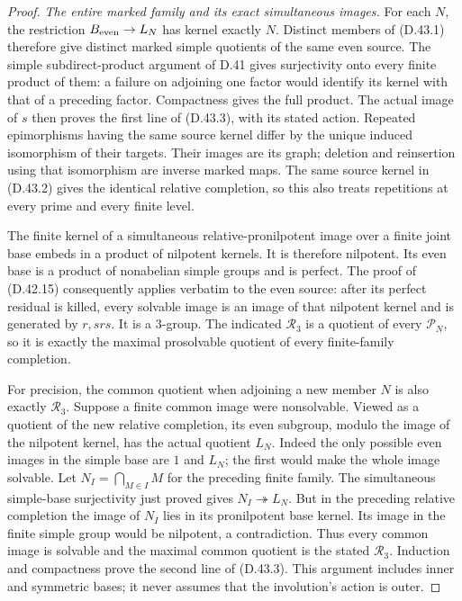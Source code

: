 \begin{proof}
\emph{The entire marked family and its exact simultaneous images.}
For each $N$, the restriction
$B_{\rm even}\to L_N$ has kernel exactly
$N$. Distinct members of (D.43.1)
therefore give distinct marked simple
quotients of the same even source.
The simple subdirect-product argument
of D.41 gives surjectivity onto every
finite product of them: a failure on
adjoining one factor would identify
its kernel with that of a preceding
factor. Compactness gives the full
product. The actual image of $s$
then proves the first line of
(D.43.3), with its stated action.
Repeated epimorphisms having the same
source kernel differ by the unique
induced isomorphism of their targets.
Their images are its graph; deletion
and reinsertion using that isomorphism
are inverse marked maps. The same
source kernel in (D.43.2) gives the
identical relative completion, so
this also treats repetitions at
every prime and every finite level.

The finite kernel of a simultaneous
relative-pronilpotent image over
a finite joint base embeds in a
product of nilpotent kernels.
It is therefore nilpotent. Its
even base is a product of
nonabelian simple groups and
is perfect. The proof of
(D.42.15) consequently applies
verbatim to the even source:
after its perfect residual is
killed, every solvable image
is an image of that nilpotent
kernel and is generated by
$r,srs$. It is a $3$-group.
The indicated $\mathcal R_3$
is a quotient of every
$\mathcal P_N$, so it is
exactly the maximal
prosolvable quotient of
every finite-family completion.

For precision, the common quotient
when adjoining a new member $N$
is also exactly $\mathcal R_3$.
Suppose a finite common image
were nonsolvable. Viewed as a
quotient of the new relative
completion, its even subgroup,
modulo the image of the
nilpotent kernel, has the
actual quotient $L_N$.
Indeed the only possible
even images in the simple
base are $1$ and $L_N$;
the first would make the
whole image solvable.
Let $N_I=\bigcap_{M\in I}M$
for the preceding finite
family. The simultaneous
simple-base surjectivity
just proved gives
$N_I\twoheadrightarrow L_N$.
But in the preceding
relative completion the
image of $N_I$ lies in its
pronilpotent base kernel.
Its image in the finite
simple group would be
nilpotent, a contradiction.
Thus every common image
is solvable and the
maximal common quotient
is the stated $\mathcal R_3$.
Induction and compactness
prove the second line of
(D.43.3). This argument
includes inner and symmetric
bases; it never assumes
that the involution's
action is outer.


\end{proof}
